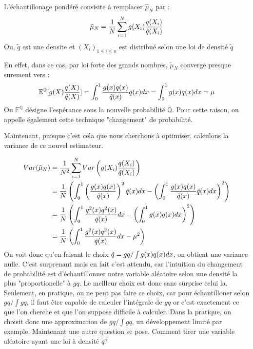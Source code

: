 \documentclass{article}
\begin{document}
L'échantillonage pondéré consisite à remplacer $\hat{\mu}_{N}$ par : 
\[\tilde{\mu}_{N}= \frac1{N} \sum_{i=1}^N g(X_i)\frac{q(X_i)}{\Tilde{q}(X_i)}\]
Ou, $\tilde{q}$ est une densite et $(X_{i})_{1\leq i \leq n }$ est distribué selon une loi de densité $\tilde{q}$ 


En effet, dans ce cas, par loi forte des grands nombres, $\tilde{\mu}_{N}$ converge presque surement vers : 
\[\mathbb{E}^{\mathbb{Q}}[g(X)\frac{q(X)}{\tilde{q}(X)}]=\int_0^1 \frac{g(x)q(x)}{\Tilde{q}(x)} \Tilde{q}(x) dx = \int_0^1 g(x)q(x)dx = \mu \]
 Ou $\mathbb{E}^{\mathbb{Q}}$ désigne l'espérance sous la nouvelle probabilité $\mathbb{Q}$. Pour cette raison, on 
 appelle également cette technique "changement" de probabilité.

Maintenant, puisque c'est cela que nous cherchons à optimiser, calculons la variance de ce nouvel estimateur.

\begin{align*} 
   Var(\tilde{\mu}_N) &= \frac1{N^2} \sum_{i=1}^N Var \left( g(X_i)\frac{q(X_i)}{\Tilde{q}(X_i)} \right)\\ 
   &= \frac1{N} \left ( \int_0^1 \left (\frac{g(x)q(x)}{\Tilde{q}(x)} \right )^2 \Tilde{q}(x) dx  - \left ( \int_0^1 \frac{g(x)q(x)}{\Tilde{q}(x)} \Tilde{q}(x) dx \right )^2 \right )\\
   &= \frac1{N} \left ( \int_0^1 \frac{g^2(x)q^2(x)}{\Tilde{q}(x)} dx  - \left ( \int_0^1 g(x)q(x) dx \right )^2 \right )\\
   &= \frac1{N} \left ( \int_0^1 \frac{g^2(x)q^2(x)}{\Tilde{q}(x)} dx  - \mu^{2} \right )\\
 \end{align*}
 On voit donc qu'en faisant le choix $\Tilde{q}=gq/ \int g(x)q(x)dx$, on obtient une variance nulle. C'est surprenant mais en fait c'est attendu,
 car l'intuition du changement de probabilité est d'échantillonner notre variable aléatoire selon
 une densité la plus "proportionelle" à $gq$. Le meilleur choix est donc sans surprise celui la. 
 Seulement, en pratique, on ne peut pas faire ce choix, car pour échantilloner selon $gq/\int gq$,
il faut être capable de calculer l'intégrale de $gq$ or c'est exactement ce que l'on 
cherche et que l'on suppose difficile à calculer. Dans la pratique, on choisit donc une
approximation de $gq/ \int gq$, un développement limité par exemple. Maintenant une autre question se
pose. Comment tirer une variable aléatoire ayant une loi à densité $\tilde{q}$? 
\end{document}
